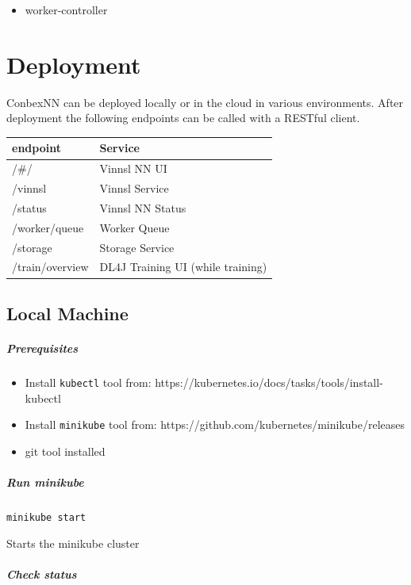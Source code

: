 \begin{itemize}
\tightlist
\item
  worker-controller
\end{itemize}

\chapter{Deployment}\label{deployment}

ConbexNN can be deployed locally or in the cloud in various
environments. After deployment the following endpoints can be called
with a RESTful client.

\begin{longtable}[]{@{}ll@{}}
\toprule
endpoint & Service\tabularnewline
\midrule
\endhead
/\#/ & Vinnsl NN UI\tabularnewline
/vinnsl & Vinnsl Service\tabularnewline
/status & Vinnsl NN Status\tabularnewline
/worker/queue & Worker Queue\tabularnewline
/storage & Storage Service\tabularnewline
/train/overview & DL4J Training UI (while training)\tabularnewline
\bottomrule
\end{longtable}

\section{Local Machine}\label{local-machine}

\paragraph{Prerequisites}\label{prerequisites}

\begin{itemize}
\tightlist
\item
  Install \texttt{kubectl} tool from:
  https://kubernetes.io/docs/tasks/tools/install-kubectl
\item
  Install \texttt{minikube} tool from:
  https://github.com/kubernetes/minikube/releases
\item
  git tool installed
\end{itemize}

\paragraph{Run minikube}\label{run-minikube}

\texttt{minikube\ start}

Starts the minikube cluster

\paragraph{Check status}\label{check-status}

